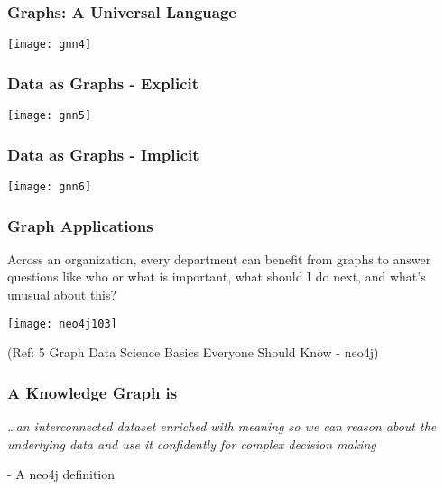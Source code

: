 \begin{frame}[fragile]\frametitle{Graphs: A Universal Language }

\begin{center}
\texttt{[image: gnn4]}
\end{center}	  

\end{frame}


\begin{frame}[fragile]\frametitle{Data as Graphs - Explicit }

\begin{center}
\texttt{[image: gnn5]}
\end{center}	  

\end{frame}

\begin{frame}[fragile]\frametitle{Data as Graphs - Implicit }

\begin{center}
\texttt{[image: gnn6]}
\end{center}	  

\end{frame}


\begin{frame}\frametitle{ Graph Applications }

Across an organization, every department can benefit from graphs to answer questions 
like who or what is important, what should I do next, and what’s unusual about this?

\begin{center}
\texttt{[image: neo4j103]}
\end{center}	  


{\tiny (Ref: 5 Graph Data Science Basics Everyone Should Know - neo4j)}
\end{frame}

\begin{frame}[fragile]\frametitle{A Knowledge Graph is}
 
\begin{center}
{\em \ldots an interconnected dataset enriched with meaning so we can reason about the underlying data and use it confidently for complex decision making}
\end{center}

	  - A neo4j definition
		
\end{frame}


